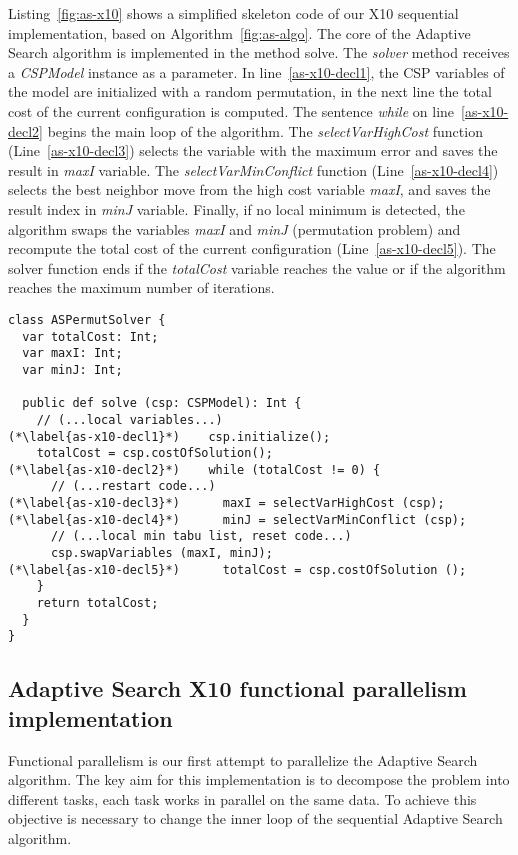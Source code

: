 \documentclass{llncs}
\begin{document}
Listing~\ref{fig:as-x10} shows a simplified skeleton code of our X10
sequential implementation, based on Algorithm~\ref{fig:as-algo}.  The
core of the Adaptive Search algorithm is implemented in the method
solve. The \emph{solver} method receives a \emph{CSPModel} instance as
a parameter. In line~\ref{as-x10-decl1}, the CSP variables of the
model are initialized with a random permutation, in the next line the
total cost of the current configuration is computed. The sentence
\emph{while} on line~\ref{as-x10-decl2} begins the main loop of
the algorithm. The \emph{selectVarHighCost} function
(Line~\ref{as-x10-decl3}) selects the variable with the maximum error
and saves the result in \emph{maxI} variable. The
\emph{selectVarMinConflict} function (Line~\ref{as-x10-decl4}) selects
the best neighbor move from the high cost variable \emph{maxI}, and
saves the result index in \emph{minJ} variable. Finally, if no local
minimum is detected, the algorithm swaps the variables \emph{maxI} and
\emph{minJ} (permutation problem) and recompute the total cost of the
current configuration (Line~\ref{as-x10-decl5}). The solver function
ends if the \emph{totalCost} variable reaches the  value or if the
algorithm reaches the maximum number of iterations.

\begin{lstlisting}[caption={Simplified AS X10 Sequential Implementation},label=fig:as-x10]
class ASPermutSolver {
  var totalCost: Int;
  var maxI: Int;
  var minJ: Int;

  public def solve (csp: CSPModel): Int {
    // (...local variables...)
(*\label{as-x10-decl1}*)    csp.initialize();
    totalCost = csp.costOfSolution();
(*\label{as-x10-decl2}*)    while (totalCost != 0) {
      // (...restart code...)
(*\label{as-x10-decl3}*)      maxI = selectVarHighCost (csp);
(*\label{as-x10-decl4}*)      minJ = selectVarMinConflict (csp);
      // (...local min tabu list, reset code...)
      csp.swapVariables (maxI, minJ);
(*\label{as-x10-decl5}*)      totalCost = csp.costOfSolution ();
    }
    return totalCost;
  }
}
\end{lstlisting}

                      \subsection{Adaptive Search X10 functional parallelism implementation}
Functional parallelism is our first attempt to parallelize
the Adaptive Search algorithm. The key aim for this
implementation is to decompose the problem into different tasks, each
task works in parallel on the same data. To achieve this objective is
necessary to change the inner loop of the sequential Adaptive Search
algorithm.
\end{document}
